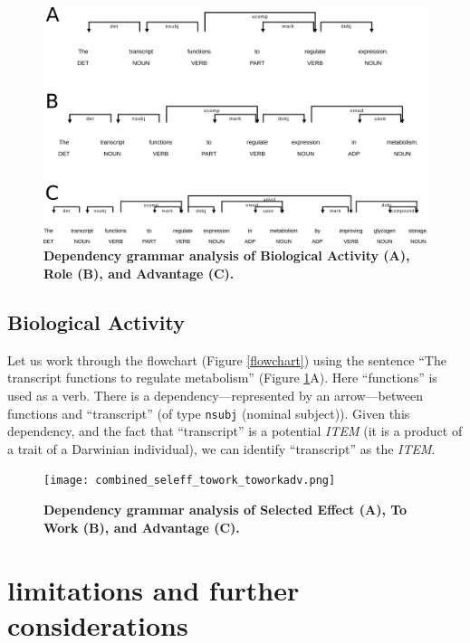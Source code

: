 \documentclass{article}
\begin{document}
\begin{figure}[ht]
  \centering
  \includegraphics[width=\linewidth]{combined_eff_role_adv.png}
  \caption[]{\textbf{Dependency grammar analysis of Biological Activity (A), Role (B), and Advantage (C).}}
  \label{eff_role_adv}
\end{figure}

\subsection{Biological Activity}
\label{sec:biological-activity}

Let us work through the flowchart (Figure \ref{flowchart}) using the sentence ``The transcript functions to regulate metabolism'' (Figure \ref{eff_role_adv}A).
Here ``functions'' is used as a verb.
There is a dependency---represented by an arrow---between functions and ``transcript'' (of type \texttt{nsubj} (nominal subject)).
Given this dependency, and the fact that ``transcript'' is a potential \emph{ITEM} (it is a product of a trait of a Darwinian individual), we can identify ``transcript'' as the \emph{ITEM}.


\begin{figure}[ht]
  \centering
  \texttt{[image: combined\_seleff\_towork\_toworkadv.png]}
  \caption[]{\textbf{Dependency grammar analysis of Selected Effect (A), To Work (B), and Advantage (C).}}
  \label{seleff_towork_toworkadv}
\end{figure}



\section{limitations and further considerations}
\label{sec:limitations}
\end{document}
